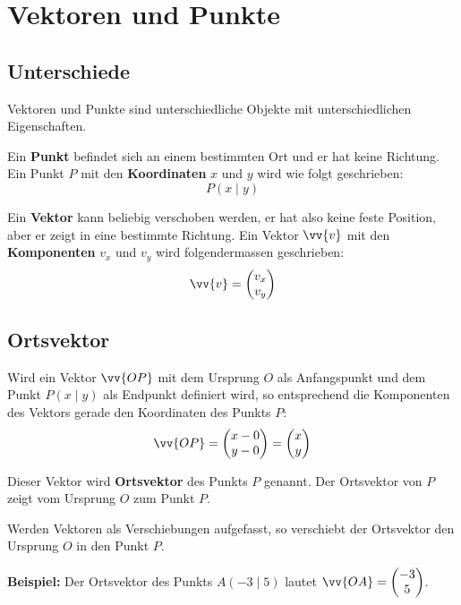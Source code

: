 \newpage
\section{Vektoren und Punkte}

\subsection{Unterschiede}
Vektoren und Punkte sind unterschiedliche Objekte mit unterschiedlichen Eigenschaften.

Ein \textbf{Punkt} befindet sich an einem bestimmten Ort und er hat keine Richtung. Ein Punkt $P$ mit den \textbf{Koordinaten} $x$ und $y$ wird wie folgt geschrieben:
\[
  P(x\mid y)
\]

Ein \textbf{Vektor} kann beliebig verschoben werden, er hat also keine feste Position, aber er zeigt in eine bestimmte Richtung. Ein Vektor $\vv{v}$ mit den \textbf{Komponenten} $v_{x}$ und $v_{y}$ wird folgendermassen geschrieben:
\[
  \vv{v} = \vxy{v_{x}}{v_{y}}
\]

\subsection{Ortsvektor}

Wird ein Vektor $\vv{OP}$ mit dem Ursprung $O$ als Anfangspunkt und dem Punkt $P(x\mid y)$ als Endpunkt definiert wird, so entsprechend die Komponenten des Vektors gerade den Koordinaten des Punkts $P$:
\[
  \vv{OP} = \vxy{x-0}{y-0} = \vxy{x}{y}
\]
\begin{center}
\end{center}

Dieser Vektor wird \textbf{Ortsvektor} des Punkts $P$ genannt. Der Ortsvektor von $P$ zeigt vom Ursprung $O$ zum Punkt $P$.

Werden Vektoren als Verschiebungen aufgefasst, so verschiebt der Ortsvektor den Ursprung $O$ in den Punkt $P$.
\begin{example}
  \textbf{Beispiel:} Der Ortsvektor des Punkts $A(-3\mid 5)$ lautet $\vv{OA} = \vxy{-3}{5}$.
\end{example}

